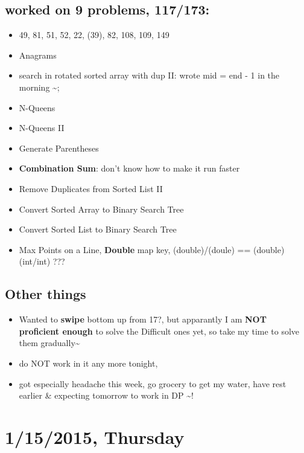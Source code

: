 \documentclass[9pt,b5paper]{article}
\begin{document}
\subsection{worked on 9 problems, 117/173:}
\label{sec-10-1}
\begin{itemize}
\item 49, 81, 51, 52, 22, (39), 82, 108, 109, 149
\item Anagrams
\item search in rotated sorted array with dup II: wrote mid = end - 1 in the morning \textasciitilde{};
\item N-Queens
\item N-Queens II
\item Generate Parentheses
\item \textbf{Combination Sum}: don't know how to make it run faster
\item Remove Duplicates from Sorted List II
\item Convert Sorted Array to Binary Search Tree
\item Convert Sorted List to Binary Search Tree
\item Max Points on a Line, \textbf{Double} map key, (double)/(doule) == (double)(int/int) ???
\end{itemize}
\subsection{Other things}
\label{sec-10-2}
\begin{itemize}
\item Wanted to \textbf{swipe} bottom up from 17?, but apparantly I am \textbf{NOT proficient enough} to solve the Difficult ones yet, so take my time to solve them gradually\textasciitilde{}~
\item do NOT work in it any more tonight,
\item got especially headache this week, go grocery to get my water, have rest earlier \& expecting tomorrow to work in DP \textasciitilde{}!
\end{itemize}
\section{1/15/2015, Thursday}
\label{sec-11}
\end{document}
